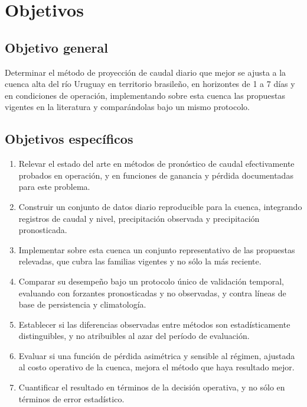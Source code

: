 
\section{Objetivos}


\subsection{Objetivo general}

Determinar el método de proyección de caudal diario que mejor se ajusta a la cuenca alta del río
Uruguay en territorio brasileño, en horizontes de 1 a 7 días y en condiciones de operación,
implementando sobre esta cuenca las propuestas vigentes en la literatura y comparándolas bajo un
mismo protocolo.

\subsection{Objetivos específicos}

\begin{enumerate}[nosep]
  \item Relevar el estado del arte en métodos de pronóstico de caudal efectivamente probados en
        operación, y en funciones de ganancia y pérdida documentadas para este problema.
  \item Construir un conjunto de datos diario reproducible para la cuenca, integrando registros de
        caudal y nivel, precipitación observada y precipitación pronosticada.
  \item Implementar sobre esta cuenca un conjunto representativo de las propuestas relevadas, que
        cubra las familias vigentes y no sólo la más reciente.
  \item Comparar su desempeño bajo un protocolo único de validación temporal, evaluando con
        forzantes pronosticadas y no observadas, y contra líneas de base de persistencia y
        climatología.
  \item Establecer si las diferencias observadas entre métodos son estadísticamente distinguibles,
        y no atribuibles al azar del período de evaluación.
  \item Evaluar si una función de pérdida asimétrica y sensible al régimen, ajustada al costo
        operativo de la cuenca, mejora el método que haya resultado mejor.
  \item Cuantificar el resultado en términos de la decisión operativa, y no sólo en términos de
        error estadístico.
\end{enumerate}

